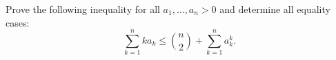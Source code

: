 Prove the following inequality for all $a_1,\ldots,a_n>0$ and determine all equality cases:
$$\sum_{k=1}^n ka_k \leq \binom{n}{2} + \sum_{k=1}^n a_k^k.$$